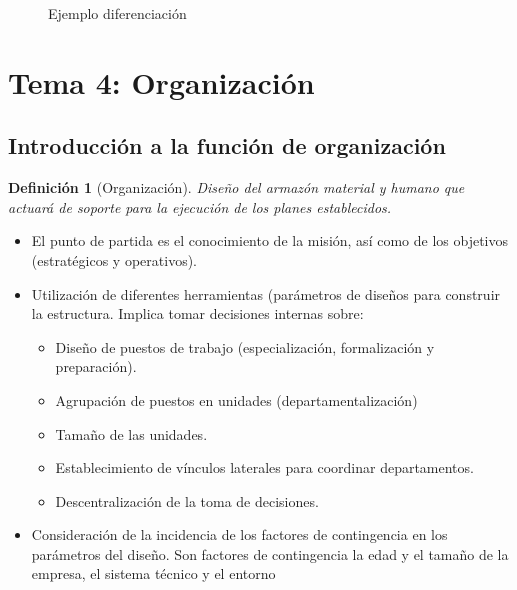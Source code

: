 \documentclass[12pt]{article}
\theoremstyle{definition_wo_parentheses}
\newtheorem{definicion}{Definición}[section]
\begin{document}
\begin{figure}[H]
 \centering
 \caption{Ejemplo diferenciación}
 \label{f:dif}
\end{figure}


\section{Tema 4: Organización}

\subsection{Introducción a la función de organización}

\begin{definicion}[Organización] 
	Diseño del armazón material y humano que actuará de soporte para la ejecución de los planes establecidos.
\end{definicion}

\begin{itemize}
\item El punto de partida es el conocimiento de la misión, así como de los objetivos (estratégicos y operativos).

\item Utilización de diferentes herramientas (parámetros de diseños para construir la estructura. Implica tomar decisiones internas sobre: 

	\begin{itemize}
		\item Diseño de puestos de trabajo (especialización, formalización y preparación).
		\item Agrupación de puestos en unidades (departamentalización)
		\item Tamaño de las unidades.
		\item Establecimiento de vínculos laterales para coordinar departamentos.
		\item Descentralización de la toma de decisiones.
	\end{itemize}
	
\item Consideración de la incidencia de los factores de contingencia en los parámetros del diseño. Son factores de contingencia la edad y el tamaño de la empresa, el sistema técnico y el entorno
\end{itemize}
\end{document}
